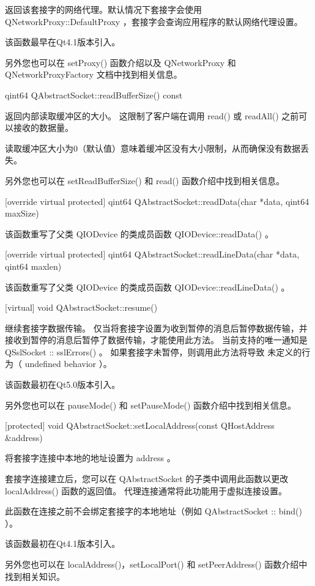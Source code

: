 返回该套接字的网络代理。默认情况下套接字会使用 QNetworkProxy::DefaultProxy ，套接字会查询应用程序的默认网络代理设置。

该函数最早在Qt4.1版本引入。

另外您也可以在 setProxy() 函数介绍以及 QNetworkProxy 和 QNetworkProxyFactory 文档中找到相关信息。

qint64 QAbstractSocket::readBufferSize() const

返回内部读取缓冲区的大小。 这限制了客户端在调用 read() 或 readAll() 之前可以接收的数据量。

读取缓冲区大小为0（默认值）意味着缓冲区没有大小限制，从而确保没有数据丢失。

另外您也可以在 setReadBufferSize() 和 read() 函数介绍中找到相关信息。

[override virtual protected] qint64 QAbstractSocket::readData(char
*data, qint64 maxSize)

该函数重写了父类 QIODevice 的类成员函数 QIODevice::readData() 。

[override virtual protected] qint64 QAbstractSocket::readLineData(char
*data, qint64 maxlen)

该函数重写了父类 QIODevice 的类成员函数 QIODevice::readLineData() 。

[virtual] void QAbstractSocket::resume()

继续套接字数据传输。 仅当将套接字设置为收到暂停的消息后暂停数据传输，并接收到暂停的消息后暂停了数据传输，才能使用此方法。 当前支持的唯一通知是 QSslSocket :: sslErrors() 。 如果套接字未暂停，则调用此方法将导致 未定义的行为（ undefined behavior ）。

该函数最初在Qt5.0版本引入。

另外您也可以在 pauseMode() 和 setPauseMode() 函数介绍中找到相关信息。

[protected] void QAbstractSocket::setLocalAddress(const QHostAddress
\&address)

将套接字连接中本地的地址设置为 address 。

套接字连接建立后，您可以在 QAbstractSocket 的子类中调用此函数以更改 localAddress() 函数的返回值。 代理连接通常将此功能用于虚拟连接设置。

\begin{notice}
此函数在连接之前不会绑定套接字的本地地址（例如 QAbstractSocket :: bind() ）。
\end{notice}

该函数最初在Qt4.1版本引入。

另外您也可以在 localAddress()，setLocalPort() 和 setPeerAddress() 函数介绍中找到相关知识。

